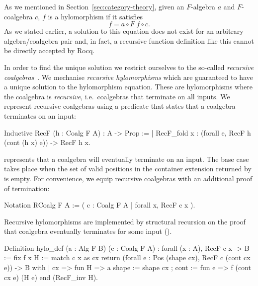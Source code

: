 \documentclass[a4paper,UKenglish,cleveref, autoref, thm-restate]{lipics-v2021}
\begin{document}
As we mentioned in Section~\ref{sec:category-theory}, given an $F$-algebra $a$ and
$F$-coalgebra $c$, $f$ is a hylomorphism if it satisfies
\[
  f = a \circ F\; f \circ c.
\]
As we stated earlier, a solution to this equation does not exist for an
arbitrary  algebra/coalgebra pair and, in fact, a recursive function definition
like this cannot be directly accepted by Rocq.

In order to find the unique solution we restrict ourselves to the so-called
\emph{recursive coalgebras}~\cite{AdamekMM19,CaprettaUV04}.  We mechanise
\emph{recursive hylomorphisms} which are guaranteed to have a unique solution to
the hylomorphism equation. These are hylomorphisms where the coalgebra is
\emph{recursive}, i.e.\ coalgebras that terminate on all inputs. We represent
recursive coalgebras using a predicate that states that a coalgebra terminates
on an input:
\begin{coqcode}
Inductive RecF (h : Coalg F A) : A -> Prop :=
| RecF_fold x : (forall e, RecF h (cont (h x) e)) -> RecF h x.
\end{coqcode}
 represents that a coalgebra will eventually terminate on an input.
The base case takes place when the set of valid positions in the
container extension returned by  is empty.  For convenience, we equip
recursive coalgebras with an additional proof of termination:
\begin{coqcode}
Notation RCoalg F A := ({ c : Coalg F A | forall x, RecF c x }).
\end{coqcode}
Recursive hylomorphisms are implemented by structural recursion on the proof
that coalgebra  eventually terminates for some input 
().
\begin{coqcode}
Definition hylo_def (a : Alg F B) (c : Coalg F A) : forall (x : A), RecF c x -> B
  := fix f x H
     := match c x as cx return (forall e : Pos (shape cx), RecF c (cont cx e)) -> B with
        | cx => fun H => a { shape := shape cx ; cont := fun e => f (cont cx e) (H e) }
        end (RecF_inv H).
\end{coqcode}
\end{document}

